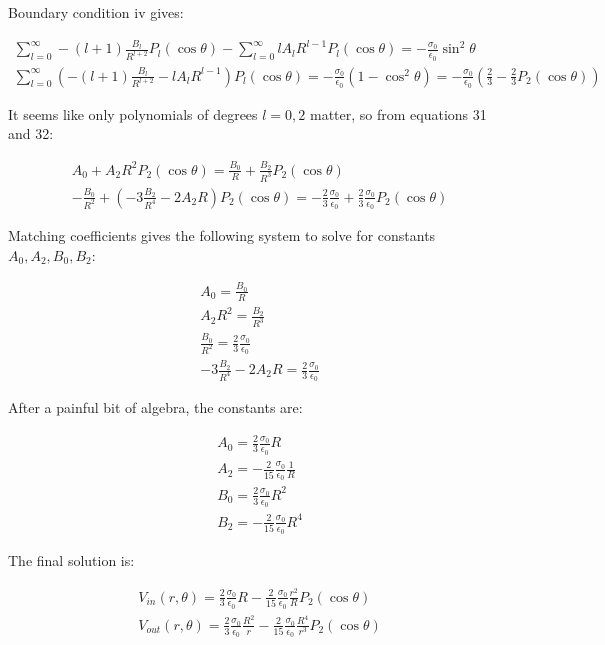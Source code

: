 \documentclass[12pt, a4paper]{article}
\begin{document}
Boundary condition iv gives:

\begin{gather}
\sum_{l=0}^\infty -(l+1)\frac{B_l}{R^{l+2}} P_l (\cos\theta) - \sum_{l=0}^\infty l A_l R^{l-1} P_l (\cos\theta) = -\frac{\sigma_0}{\epsilon_0} \sin^2\theta \\
\sum_{l=0}^\infty \left( -(l+1)\frac{B_l}{R^{l+2}} - l A_l R^{l-1} \right) P_l (\cos\theta) = -\frac{\sigma_0}{\epsilon_0} (1-\cos^2\theta) = -\frac{\sigma_0}{\epsilon_0} \left(\frac{2}{3}-\frac{2}{3}P_2(\cos\theta)\right)
\end{gather}

It seems like only polynomials of degrees $l=0,2$ matter, so from equations 31 and 32:

\begin{gather}
A_0 + A_2 R^2 P_2 (\cos\theta) = \frac{B_0}{R} + \frac{B_2}{R^3} P_2 (\cos\theta) \\
-\frac{B_0}{R^{2}} + \left( -3\frac{B_2}{R^{4}} - 2 A_2 R \right) P_2 (\cos\theta) = -\frac{2}{3} \frac{\sigma_0}{\epsilon_0} + \frac{2}{3} \frac{\sigma_0}{\epsilon_0} P_2(\cos\theta)
\end{gather}

Matching coefficients gives the following system to solve for constants $A_0, A_2, B_0, B_2$:

\begin{gather}
A_0 = \frac{B_0}{R} \\
A_2 R^2 = \frac{B_2}{R^3} \\
\frac{B_0}{R^{2}} = \frac{2}{3} \frac{\sigma_0}{\epsilon_0} \\
-3\frac{B_2}{R^{4}} - 2 A_2 R = \frac{2}{3} \frac{\sigma_0}{\epsilon_0}
\end{gather}

After a painful bit of algebra, the constants are:

\begin{gather}
A_0 = \frac{2}{3}\frac{\sigma_0}{\epsilon_0} R \\
A_2 = -\frac{2}{15} \frac{\sigma_0}{\epsilon_0} \frac{1}{R} \\
B_0 = \frac{2}{3}\frac{\sigma_0}{\epsilon_0} R^2 \\
B_2 = -\frac{2}{15} \frac{\sigma_0}{\epsilon_0} R^4
\end{gather}

The final solution is:

\begin{gather}
V_{in} (r, \theta) = \frac{2}{3}\frac{\sigma_0}{\epsilon_0} R - \frac{2}{15} \frac{\sigma_0}{\epsilon_0} \frac{r^2}{R} P_2 (\cos\theta) \\
V_{out} (r, \theta) = \frac{2}{3}\frac{\sigma_0}{\epsilon_0} \frac{R^2}{r} - \frac{2}{15} \frac{\sigma_0}{\epsilon_0} \frac{R^4}{r^3} P_2 (\cos\theta)
\end{gather}
\end{document}
